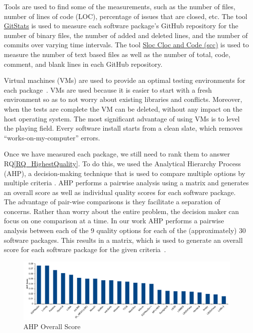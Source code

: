 \documentclass[runningheads]{llncs}
\newcommand{\rqref}[1]{RQ\ref{#1}}
\begin{document}
Tools are used to find some of the measurements, such as the number of files,
number of lines of code (LOC), percentage of issues that are closed, etc. The
tool \href{https://github.com/tomgi/git_stats}{GitStats} is used to measure
each software package's GitHub repository for the number of binary files, the
number of added and deleted lines, and the number of commits over varying time
intervals. The tool \href{https://github.com/boyter/scc}{Sloc Cloc and Code
(scc)} is used to measure the number of text based files as well as the number
of total, code, comment, and blank lines in each GitHub repository.

Virtual machines (VMs) are used to provide an optimal testing environments for
each package~\cite{SmithEtAl2016}. VMs are used because it is easier to start
with a fresh environment so as to not worry about existing libraries and
conflicts. Moreover, when the tests are complete the VM can be deleted, without
any impact on the host operating system. The most significant advantage of using
VMs is to level the playing field. Every software install starts from a clean
slate, which removes ``works-on-my-computer'' errors.

Once we have measured each package, we still need to rank them to answer
\rqref{RQ_HighestQuality}.  To do this, we used the Analytical Hierarchy Process
(AHP), a decision-making technique that is used to compare multiple options by
multiple criteria \cite{Saaty1980}. AHP performs a pairwise analysis using a
matrix and generates an overall score as well as individual quality scores for
each software package. The advantage of pair-wise comparisons is they facilitate
a separation of concerns.  Rather than worry about the entire problem, the
decision maker can focus on one comparison at a time.  In our work AHP performs
a pairwise analysis between each of the 9 quality options for each of the
(approximately) 30 software packages.  This results in a matrix, which is used
to generate an overall score for each software package for the given
criteria~\cite{SmithEtAl2016}.

\begin{figure}[h!]
	\centering
		\includegraphics[width=1.0\textwidth]{./figures/finalscore_chart.pdf}
		\caption{AHP Overall Score}
		\label{Fig_OverallScore}
\end{figure}
\end{document}
